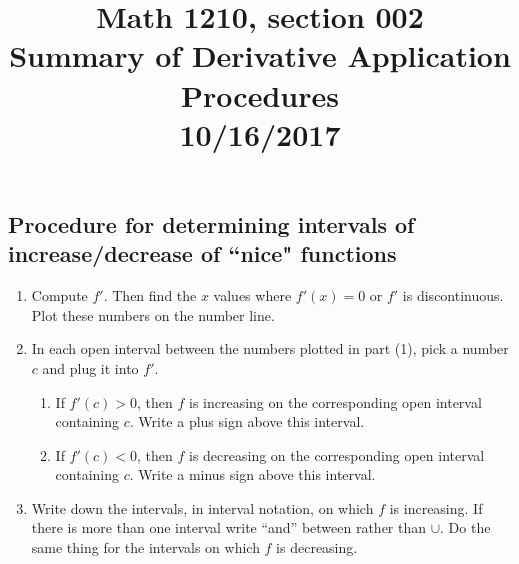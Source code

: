 \documentclass[reqno,psamsfonts]{amsart}
\title{Math 1210, section 002\\Summary of Derivative Application Procedures\\10/16/2017}
\theoremstyle{definition}
\theoremstyle{remark}
\numberwithin{equation}{section}
\begin{document}
\maketitle
\thispagestyle{empty}
\noindent

\subsection*{Procedure for determining intervals of increase/decrease of ``nice" functions}
\begin{enumerate}
\item Compute $f'$. Then find the $x$ values where $f'(x) = 0$ or $f'$ is discontinuous. Plot these numbers on the number line. 
\\
\item In each open interval between the numbers plotted in part (1), pick a number $c$ and plug it into $f'$. 
\begin{enumerate}
\item If $f'(c)>0$, then $f$ is increasing on the corresponding open interval containing $c$. Write a plus sign above this interval.
\item If $f'(c)<0$, then $f$ is decreasing on the corresponding open interval containing $c$. Write a minus sign above this interval. 
\\
\end{enumerate}
\item Write down the intervals, in interval notation, on which $f$ is increasing. If there is more than one interval write ``and'' between rather than $\cup$. Do the same thing for the intervals on which $f$ is decreasing. 
\end{enumerate}
\end{document}
